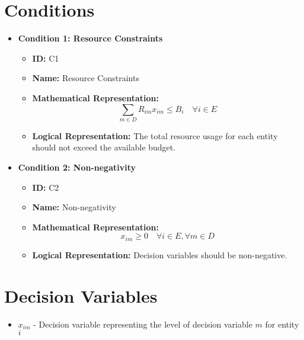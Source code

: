 \documentclass{article}
\begin{document}
\section{Conditions}
\begin{itemize}
    \item \textbf{Condition 1: Resource Constraints}
    \begin{itemize}
        \item \textbf{ID:} C1
        \item \textbf{Name:} Resource Constraints
        \item \textbf{Mathematical Representation:}
        \[
        \sum_{m \in D} R_{im} x_{im} \leq B_i \quad \forall i \in E
        \]
        \item \textbf{Logical Representation:} The total resource usage for each entity should not exceed the available budget.
    \end{itemize}
    \item \textbf{Condition 2: Non-negativity}
    \begin{itemize}
        \item \textbf{ID:} C2
        \item \textbf{Name:} Non-negativity
        \item \textbf{Mathematical Representation:}
        \[
        x_{im} \geq 0 \quad \forall i \in E, \forall m \in D
        \]
        \item \textbf{Logical Representation:} Decision variables should be non-negative.
    \end{itemize}
\end{itemize}

\section{Decision Variables}
\begin{itemize}
    \item $x_{im}$ - Decision variable representing the level of decision variable $m$ for entity $i$
\end{itemize}
\end{document}
